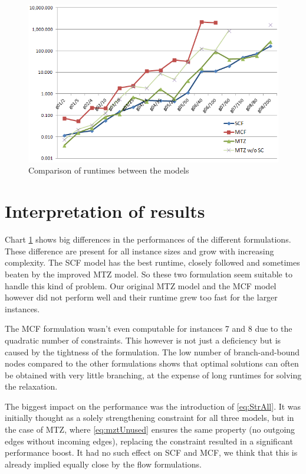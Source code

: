 \documentclass[,%
			paper=a4,%
			DIV14,
			liststotoc,
			bibtotoc,
			draft=false,%
			numbers=noendperiod
			]{scrartcl}
\begin{document}
\begin{figure}[htb]
	\centering	\includegraphics[width=1.00\textwidth]{chart.png}
	\caption{Comparison of runtimes between the models}
	\label{fig:chart}
\end{figure}


\section{Interpretation of results}
Chart \ref{fig:chart} shows big differences in the performances of the different formulations. These difference are present for all instance sizes and grow with increasing complexity. The SCF model has the best runtime, closely followed and sometimes beaten by the improved MTZ model. So these two formulation seem suitable to handle this kind of problem. Our original MTZ model and the MCF model however did not perform well and their runtime grew too fast for the larger instances.


The MCF formulation wasn't even computable for instances 7 and 8 due to the quadratic number of constraints. This however is not just a deficiency but is caused by the tightness of the formulation. The low number of branch-and-bound nodes compared to the other formulations shows that optimal solutions can often be obtained with very little branching, at the expense of long runtimes for solving the relaxation.


The biggest impact on the performance was the introduction of \eqref{eq:StrAll}. It was initially thought as a solely strengthening constraint for all three models, but in the case of MTZ, where \eqref{eq:mztUnused} ensures the same property (no outgoing edges without incoming edges), replacing the constraint resulted in a significant performance boost. It had no such effect on SCF and MCF, we think that this is already implied equally close by the flow formulations.
\end{document}
